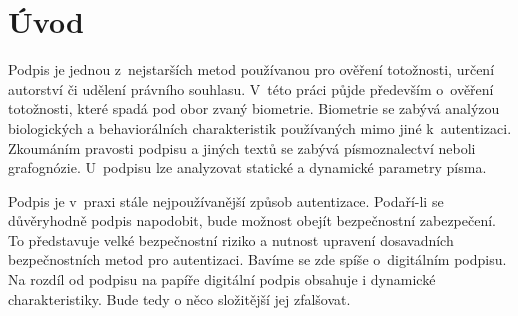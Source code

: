 
%

\chapter{Úvod}
Podpis je jednou z~nejstarších metod používanou pro ověření totožnosti, určení autorství či udělení právního souhlasu.
V~této práci půjde především o~ověření totožnosti, které spadá pod obor zvaný biometrie.
Biometrie se zabývá analýzou biologických a behaviorálních charakteristik používaných mimo jiné k~autentizaci. 
Zkoumáním pravosti podpisu a jiných textů se zabývá písmoznalectví neboli grafognózie.
U~podpisu lze analyzovat statické a dynamické parametry písma. 

Podpis je v~praxi stále nejpoužívanější způsob autentizace. 
Podaří-li se důvěryhodně podpis napodobit, bude možnost obejít bezpečnostní zabezpečení. 
To představuje velké bezpečnostní riziko a nutnost upravení dosavadních bezpečnostních metod pro autentizaci. 
Bavíme se zde spíše o~digitálním podpisu. 
Na rozdíl od podpisu na papíře digitální podpis obsahuje i dynamické charakteristiky.
Bude tedy o něco složitější jej zfalšovat.



